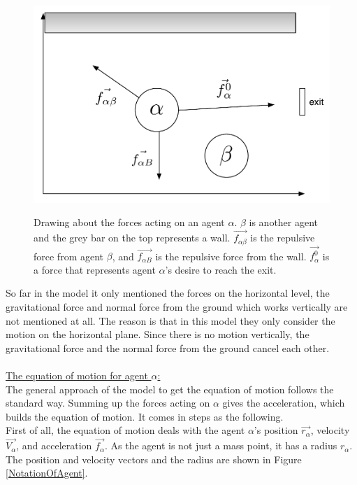 \begin{figure}[hb]
    \centering
    {\includegraphics[scale=0.45]{Figures/ForceModel.pdf}} 
    \caption{Drawing about the forces acting on an agent $ \alpha $. $ \beta $ is another agent and the grey bar on the top represents a wall. $ \vec{f_{\alpha\beta}} $ is the repulsive force from agent $ \beta $, and $ \vec{f_{\alpha B}} $ is the repulsive force from the wall. $ \vec{f^{0}_{\alpha}} $ is a force that represents agent $ \alpha $'s desire to reach the exit.}
    \label{ForceModel}
\end{figure}

So far in the model it only mentioned the forces on the horizontal level, the gravitational force and normal force from the ground which works vertically are not mentioned at all.  The reason is that in this model they only consider the motion on the horizontal plane.  Since there is no motion vertically, the gravitational force and the normal force from the ground cancel each other.\\\\
\underline{The equation of motion for agent $ \alpha $:}\\

The general approach of the model to get the equation of motion follows the standard way. Summing up the forces acting on $ \alpha $ gives the acceleration, which builds the equation of motion. It comes in steps as the following.\\
First of all, the equation of motion deals with the agent $ \alpha $'s position $ \vec{r_{\alpha}} $, velocity $ \vec{V_{\alpha}} $, and acceleration $ \vec{f_{\alpha}} $. As the agent is not just a mass point, it has a radius $ r_{\alpha} $. The position and velocity vectors and the radius are shown in Figure \ref{NotationOfAgent}.

